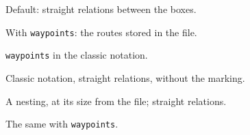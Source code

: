 \documentclass{article}
\begin{document}
\begin{figure}[p]
  \centering
  \caption{Default: straight relations between the boxes.}
\end{figure}

\begin{figure}[p]
  \centering
  \caption{With \texttt{waypoints}: the routes stored in the file.}
\end{figure}

\begin{figure}[p]
  \centering
  \caption{\texttt{waypoints} in the classic notation.}
\end{figure}

\begin{figure}[p]
  \centering
  \caption{Classic notation, straight relations, without the marking.}
\end{figure}

\begin{figure}[p]
  \centering
  \caption{A nesting, at its size from the file; straight relations.}
\end{figure}

\begin{figure}[p]
  \centering
  \caption{The same with \texttt{waypoints}.}
\end{figure}
\end{document}
